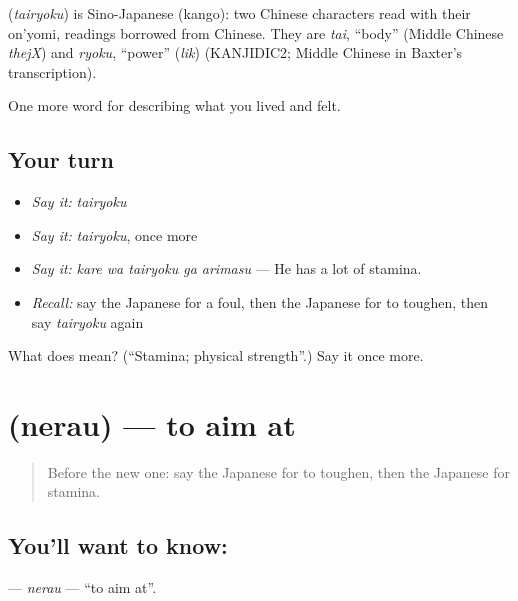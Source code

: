 \begin{cousinweb}
\textbf{} (\emph{tairyoku}) is Sino-Japanese (kango): two Chinese characters read with their on'yomi, readings borrowed from Chinese. They are \emph{tai}, \textquotedblleft{}body\textquotedblright{} (Middle Chinese \emph{thejX}) and \emph{ryoku}, \textquotedblleft{}power\textquotedblright{} (\emph{lik}) (KANJIDIC2; Middle Chinese in Baxter's transcription).
\end{cousinweb}

\begin{grammarlens}[title={What you've built}]
One more word for describing what you lived and felt.
\end{grammarlens}

\subsection*{Your turn}
\begin{itemize}
\raggedright
  \item \emph{Say it:} \emph{tairyoku}
  \item \emph{Say it:} \emph{tairyoku}, once more
  \item \emph{Say it:} \emph{kare wa tairyoku ga arimasu} — He has a lot of stamina.
  \item \emph{Recall:} say the Japanese for a foul, then the Japanese for to toughen, then say \emph{tairyoku} again
\end{itemize}

\begin{tcolorbox}[breakable,colback=teal!4,colframe=teal!35!black,title={Before you move on}]
What does  mean? (\textquotedblleft{}Stamina; physical strength\textquotedblright{}.) Say it once more.
\end{tcolorbox}
\section[\texorpdfstring{\ja{ねらう} (nerau)}{ねらう (nerau)}]{ (nerau) — to aim at}

\label{lesson:JA-C463-nerau}



\begin{quote}
Before the new one: say the Japanese for to toughen, then the Japanese for stamina.
\end{quote}

\subsection*{You'll want to know: }
\textbf{} — \emph{nerau} — \textquotedblleft{}to aim at\textquotedblright{}.

